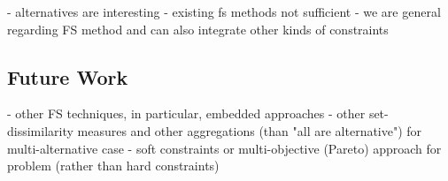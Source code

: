 \documentclass{article}
\theoremstyle{definition}
\begin{document}
- alternatives are interesting
- existing fs methods not sufficient
- we are general regarding FS method and can also integrate other kinds of constraints

\subsection{Future Work}

- other FS techniques, in particular, embedded approaches
- other set-dissimilarity measures and other aggregations (than "all are alternative") for multi-alternative case
- soft constraints or multi-objective (Pareto) approach for problem (rather than hard constraints)

\printbibliography
\end{document}
